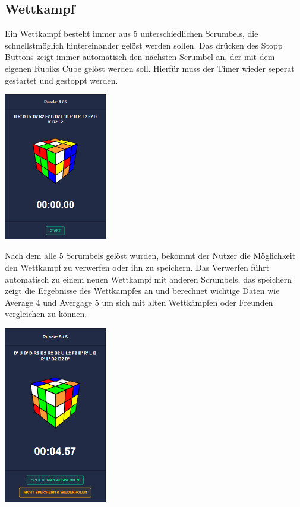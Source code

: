 \documentclass[a4paper]{article}
\theoremstyle{definition}
\begin{document}
\subsection*{Wettkampf}
Ein Wettkampf besteht immer aus 5 unterschiedlichen Scrumbels, die schnellstmöglich hintereinander gelöst werden sollen. Das drücken des Stopp Buttons zeigt immer automatisch den nächsten Scrumbel an, der mit dem eigenen Rubiks Cube gelöst werden soll. Hierfür muss der Timer wieder seperat gestartet und gestoppt werden.
\vspace{0.25cm}
\begin{center}
	\includegraphics[width= 4.5cm, keepaspectratio]{img/competition}
\end{center}
\vspace{0.25cm}
Nach dem alle 5 Scrumbels gelöst wurden, bekommt der Nutzer die Möglichkeit den Wettkampf zu verwerfen oder ihn zu speichern. Das Verwerfen führt automatisch zu einem neuen Wettkampf mit anderen Scrumbels, das speichern zeigt die Ergebnisse des Wettkampfes an und berechnet wichtige Daten wie Average 4 und Avergage 5 um sich mit alten Wettkämpfen oder Freunden vergleichen zu können.
\begin{center}
	\includegraphics[width= 4.5cm, keepaspectratio]{img/competitiondone}
\end{center}
\end{document}
